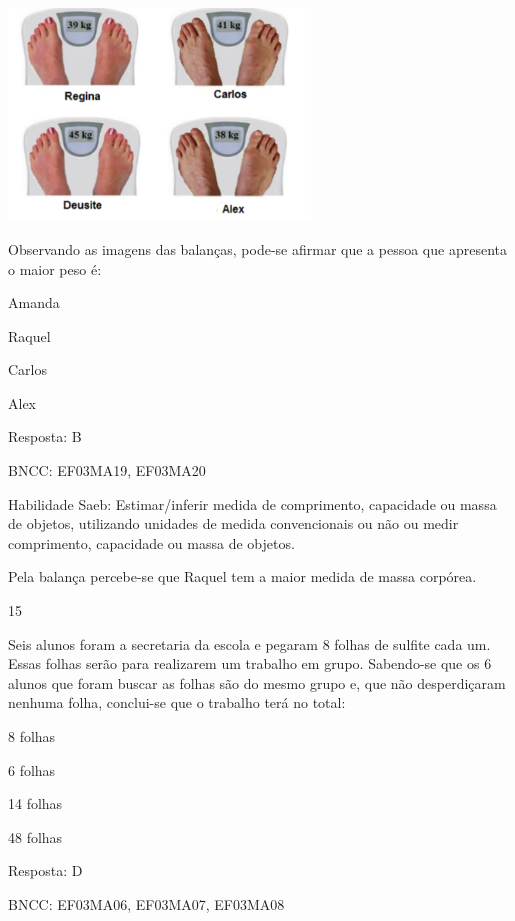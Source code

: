 \begin{escolha}
\begin{escolha}
\includegraphics[width=3.15196in,height=2.22201in]{media/image128.png}

Observando as imagens das balanças, pode-se afirmar que a pessoa que
apresenta o maior peso é:

\begin{escolha}

\item
  Amanda
\item
  Raquel
\item
  Carlos
\item
  Alex
\end{escolha}

Resposta: B

BNCC: EF03MA19, EF03MA20

Habilidade Saeb: Estimar/inferir medida de comprimento, capacidade ou
massa de objetos, utilizando unidades de medida convencionais ou não ou
medir comprimento, capacidade ou massa de objetos.

Pela balança percebe-se que Raquel tem a maior medida de massa corpórea.

\num{15}

Seis alunos foram a secretaria da escola e pegaram 8 folhas de sulfite
cada um. Essas folhas serão para realizarem um trabalho em grupo.
Sabendo-se que os 6 alunos que foram buscar as folhas são do mesmo grupo
e, que não desperdiçaram nenhuma folha, conclui-se que o trabalho terá
no total:

\begin{escolha}

\item
  8 folhas
\item
  6 folhas
\item
  14 folhas
\item
  48 folhas
\end{escolha}

Resposta: D

BNCC: EF03MA06, EF03MA07, EF03MA08


\end{escolha}
\end{escolha}
